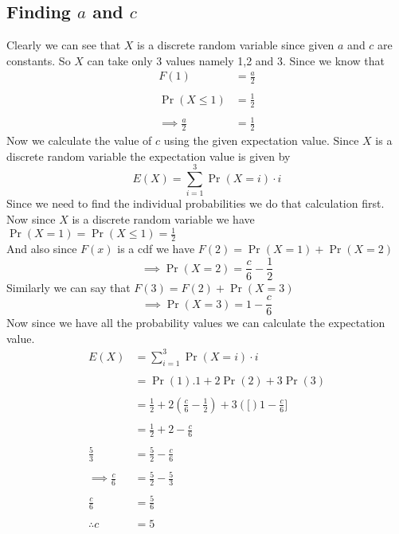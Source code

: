 \documentclass[journal,12pt,twocolumn]{IEEEtran}
\providecommand{\brak}[1]{\ensuremath{\left(#1\right)}}
\begin{document}
\subsection{Finding $a$ and $c$}
Clearly we can see that $X$ is a discrete random variable since given $a$ and $c$ are constants. So $X$ can take only 3 values namely 1,2 and 3.
Since we know that 
\begin{align}
\nonumber F\brak{1} &= \frac{a}{2}\\
\nonumber \\
\nonumber \Pr\brak{X\leq1} &= \frac{1}{2}\\
\nonumber \\
\nonumber \implies\frac{a}{2} &= \frac{1}{2}
\end{align}
Now we calculate the value of $c$ using the given expectation value. Since $X$
is a discrete random variable the expectation value is given by 
$$E\brak{X} = \sum_{i=1}^{3}\Pr\brak{X=i}\cdot i$$
Since we need to find the individual probabilities we do that calculation first.
Now since $X$ is a discrete random variable we have $\Pr\brak{X=1} = \Pr\brak{X\leq1} = \frac{1}{2}$\\And also since $F\brak{x}$ is a cdf we have $F\brak{2} = \Pr\brak{X=1}+\Pr\brak{X=2}$\\
$$\implies \Pr\brak{X=2} = \frac{c}{6}-\frac{1}{2}$$
Similarly we can say that $F\brak{3} = F\brak{2} + \Pr\brak{X=3}$
$$\implies \Pr\brak{X=3} = 1 - \frac{c}{6}$$
Now since we have all the probability values we can calculate the expectation value.
\begin{align}
\nonumber E\brak{X} &= \sum_{i=1}^{3}\Pr\brak{X=i}\cdot i\\
\nonumber \\
\nonumber &= \Pr\brak{1}.1 +2\Pr\brak{2} + 3\Pr\brak{3}\\
\nonumber \\
\nonumber &= \frac{1}{2}+ 2\brak{\frac{c}{6}-\frac{1}{2}}+3\brak[1-\frac{c}{6}]\\
\nonumber \\
\nonumber &= \frac{1}{2} + 2 - \frac{c}{6}\\
\nonumber \\
\nonumber \frac{5}{3} &= \frac{5}{2} - \frac{c}{6}\\
\nonumber \\
\nonumber \implies \frac{c}{6} &= \frac{5}{2} - \frac{5}{3}\\
\nonumber \\
\nonumber \frac{c}{6} &= \frac{5}{6}\\
\nonumber \\
\nonumber \therefore c &= 5
\end{align}
\end{document}
